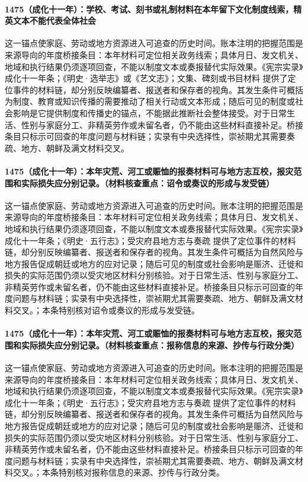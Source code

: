 \paragraph{1475（成化十一年）：学校、考试、刻书或礼制材料在本年留下文化制度线索，精英文本不能代表全体社会} 这一锚点使家庭、劳动或地方资源进入可追查的历史时间。账本注明的把握范围是来源导向的年度桥接条目：本年材料可定位相关政务线索；具体月日、发文机关、地域和执行结果仍须逐项回查，不能以制度文本或奏报替代实际效果。《宪宗实录》成化十一年条；《明史·选举志》或《艺文志》；文集、碑刻或书目材料 提供了定位事件的材料链，却分别反映编纂者、报送者和保存者的视角。其发生条件可概括为制度、教育或知识传播的需要推动了相关行动或文本形成；随后可见的制度或社会影响是它提供制度和传播史的锚点，不能据此推断社会整体接受。对于日常生活、性别与家庭分工、非精英劳作或未留名者，仍不能由这些材料直接补足。桥接条目只标示可回查的年度问题与材料链；实录有中央选择性，崇祯期尤其需要奏疏、地方、朝鲜及满文材料交叉。

\paragraph{1475（成化十一年）：本年灾荒、河工或赈恤的报奏材料可与地方志互校，报灾范围和实际损失应分别记录。（材料核查重点：诏令或奏议的形成与发受链）} 这一锚点使家庭、劳动或地方资源进入可追查的历史时间。账本注明的把握范围是来源导向的年度桥接条目：本年材料可定位相关政务线索；具体月日、发文机关、地域和执行结果仍须逐项回查，不能以制度文本或奏报替代实际效果。《宪宗实录》成化十一年条；《明史·五行志》；受灾府县地方志与奏疏 提供了定位事件的材料链，却分别反映编纂者、报送者和保存者的视角。其发生条件可概括为自然风险与地方报告促成朝廷或地方的应对记录；随后可见的制度或社会影响是赈济、迁徙和损失的实际范围仍须以受灾地区材料分别核验。对于日常生活、性别与家庭分工、非精英劳作或未留名者，仍不能由这些材料直接补足。桥接条目只标示可回查的年度问题与材料链；实录有中央选择性，崇祯期尤其需要奏疏、地方、朝鲜及满文材料交叉。；本条特别核对诏令或奏议的形成与发受链。

\paragraph{1475（成化十一年）：本年灾荒、河工或赈恤的报奏材料可与地方志互校，报灾范围和实际损失应分别记录。（材料核查重点：报称信息的来源、抄传与行政分类）} 这一锚点使家庭、劳动或地方资源进入可追查的历史时间。账本注明的把握范围是来源导向的年度桥接条目：本年材料可定位相关政务线索；具体月日、发文机关、地域和执行结果仍须逐项回查，不能以制度文本或奏报替代实际效果。《宪宗实录》成化十一年条；《明史·五行志》；受灾府县地方志与奏疏 提供了定位事件的材料链，却分别反映编纂者、报送者和保存者的视角。其发生条件可概括为自然风险与地方报告促成朝廷或地方的应对记录；随后可见的制度或社会影响是赈济、迁徙和损失的实际范围仍须以受灾地区材料分别核验。对于日常生活、性别与家庭分工、非精英劳作或未留名者，仍不能由这些材料直接补足。桥接条目只标示可回查的年度问题与材料链；实录有中央选择性，崇祯期尤其需要奏疏、地方、朝鲜及满文材料交叉。；本条特别核对报称信息的来源、抄传与行政分类。

